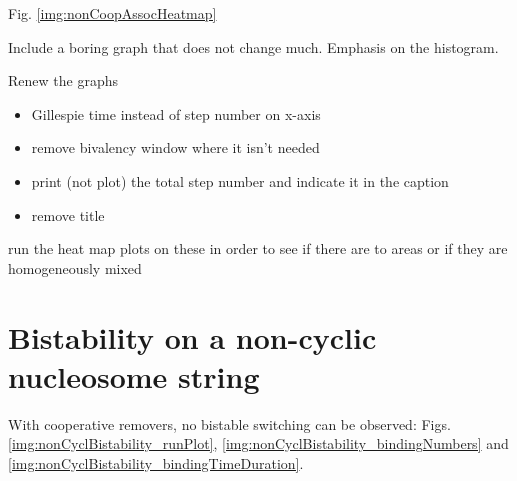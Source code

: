         Fig. \ref{img:nonCoopAssocHeatmap}
        \begin{itemize}
            {
                \color{red}
                \item Include a boring graph that does not change much. Emphasis on the histogram.  %
                \item Renew the graphs
                    \begin{itemize}
                        \item Gillespie time instead of step number on x-axis
                        \item remove bivalency window where it isn't needed
                        \item print (not plot) the total step number and indicate it in the caption
                        \item remove title
                    \end{itemize}
                \item run the heat map plots on these in order to see if there are to areas or if they are homogeneously mixed
            }
        \end{itemize}
    \newpage
    \section{Bistability on a non-cyclic nucleosome string}
        \label{sec:ResNonCyc}
        With cooperative removers, no bistable switching can be observed: Figs. \ref{img:nonCyclBistability_runPlot}, \ref{img:nonCyclBistability_bindingNumbers} and \ref{img:nonCyclBistability_bindingTimeDuration}.


